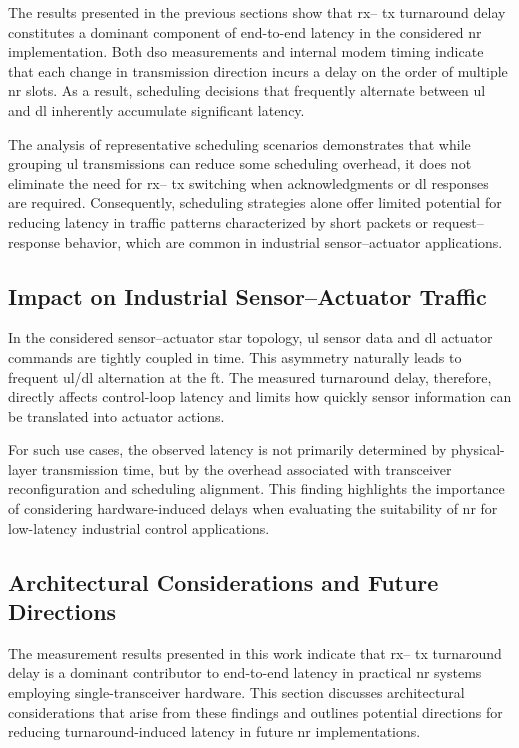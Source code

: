 \documentclass[conference]{IEEEtran}
\begin{document}
The results presented in the previous sections show that  \gls{rx}-- \gls{tx} turnaround delay constitutes a dominant component of end-to-end latency in the considered \gls{nr} implementation. Both \gls{dso} measurements and internal modem timing indicate that each change in transmission direction incurs a delay on the order of multiple \gls{nr} slots. As a result, scheduling decisions that frequently alternate between \gls{ul} and \gls{dl} inherently accumulate significant latency.

The analysis of representative scheduling scenarios demonstrates that while grouping \gls{ul} transmissions can reduce some scheduling overhead, it does not eliminate the need for \gls{rx}-- \gls{tx} switching when acknowledgments or \gls{dl} responses are required. Consequently, scheduling strategies alone offer limited potential for reducing latency in traffic patterns characterized by short packets or request--response behavior, which are common in industrial sensor--actuator applications.

\subsection{Impact on Industrial Sensor--Actuator Traffic}

In the considered sensor--actuator star topology, \gls{ul} sensor data and \gls{dl} actuator commands are tightly coupled in time. This asymmetry naturally leads to frequent \gls{ul}/\gls{dl} alternation at the \gls{ft}. The measured turnaround delay, therefore, directly affects control-loop latency and limits how quickly sensor information can be translated into actuator actions.

For such use cases, the observed latency is not primarily determined by physical-layer transmission time, but by the overhead associated with transceiver reconfiguration and scheduling alignment. This finding highlights the importance of considering hardware-induced delays when evaluating the suitability of \gls{nr} for low-latency industrial control applications.

\subsection{Architectural Considerations and Future Directions}

The measurement results presented in this work indicate that  \gls{rx}-- \gls{tx} turnaround delay is a dominant contributor to end-to-end latency in practical \gls{nr} systems employing single-transceiver hardware. This section discusses architectural considerations that arise from these findings and outlines potential directions for reducing turnaround-induced latency in future \gls{nr} implementations.
\end{document}
